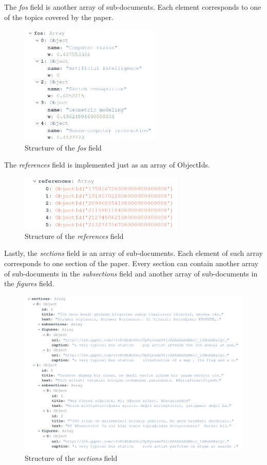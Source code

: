 \documentclass{Configuration_Files/PoliMi3i_thesis}
\begin{document}
\pagebreak
The \textit{fos} field is another array of sub-documents. Each element corresponds to one of the topics covered by the paper. 
 \begin{figure}[H]
    \centering
    \includegraphics[width=0.6\textwidth]{Images/data/doc_fos.png}
    \caption{Structure of the \textit{fos} field}
\end{figure}

The \textit{references} field is implemented just as an array of ObjectIds.
 \begin{figure}[H]
    \centering
    \includegraphics[width=0.7\textwidth]{Images/data/mongodb/doc_references.png}
    \caption{Structure of the \textit{references} field}
\end{figure}

\pagebreak
Lastly, the \textit{sections} field is an array of sub-documents. Each element of such array corresponds to one section of the paper. Every section can contain another array of sub-documents in the \textit{subsections} field and another array of sub-documents in the \textit{figures} field.
 \begin{figure}[H]
    \centering
    \includegraphics[width=\textwidth]{Images/data/doc_sections.png}
    \caption{Structure of the \textit{sections} field}
\end{figure}
\end{document}

